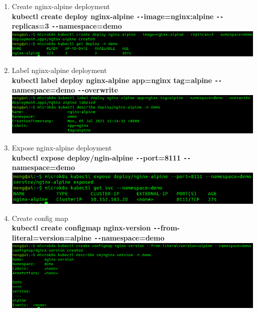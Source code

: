 \documentclass[12pt, times, a4paper]{article}
\begin{document}
\begin{enumerate}
\item Create nginx-alpine deployment \\
\textbf{kubectl create deploy nginx-alpine \texttt{-{}-}image=nginx:alpine \texttt{-{}-}replicas=3 \texttt{-{}-}namespace=demo} \\
\newline
\includegraphics[width=\textwidth]{fig/nginx-deploy.png}

\item Label nginx-alpine deployment \\
\textbf{kubectl label deploy nginx-alpine app=nginx tag=alpine \texttt{-{}-}namespace=demo \texttt{-{}-}overwrite} \\
\newline
\includegraphics[width=\textwidth]{fig/nginx-app-tag.png}

\item Expose nginx-alpine deployment \\
\textbf{kubectl expose deploy/ngin-alpine \texttt{-{}-}port=8111 \texttt{-{}-}namespace=demo} \\
\newline
\includegraphics[width=\textwidth]{fig/nginx-svc.png}

\item Create config map \\
\textbf{kubectl create configmap nginx-version \texttt{-{}-}from-literal=version=alpine \texttt{-{}-}namespace=demo} \\
\newline
\includegraphics[width=\textwidth]{fig/nginx-config.png}

\end{enumerate}
\end{document}
